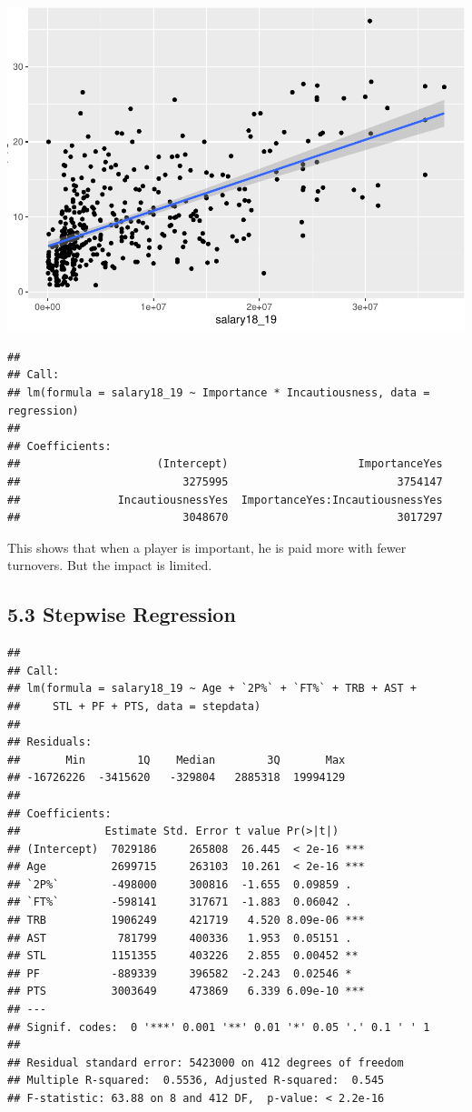 \documentclass[]{article}
\begin{document}
\includegraphics{Final_Report_files/figure-latex/unnamed-chunk-16-1.pdf}

\begin{verbatim}
## 
## Call:
## lm(formula = salary18_19 ~ Importance * Incautiousness, data = regression)
## 
## Coefficients:
##                     (Intercept)                    ImportanceYes  
##                         3275995                          3754147  
##               IncautiousnessYes  ImportanceYes:IncautiousnessYes  
##                         3048670                          3017297
\end{verbatim}

This shows that when a player is important, he is paid more with fewer
turnovers. But the impact is limited.

\subsection{5.3 Stepwise Regression}\label{stepwise-regression}

\begin{verbatim}
## 
## Call:
## lm(formula = salary18_19 ~ Age + `2P%` + `FT%` + TRB + AST + 
##     STL + PF + PTS, data = stepdata)
## 
## Residuals:
##       Min        1Q    Median        3Q       Max 
## -16726226  -3415620   -329804   2885318  19994129 
## 
## Coefficients:
##             Estimate Std. Error t value Pr(>|t|)    
## (Intercept)  7029186     265808  26.445  < 2e-16 ***
## Age          2699715     263103  10.261  < 2e-16 ***
## `2P%`        -498000     300816  -1.655  0.09859 .  
## `FT%`        -598141     317671  -1.883  0.06042 .  
## TRB          1906249     421719   4.520 8.09e-06 ***
## AST           781799     400336   1.953  0.05151 .  
## STL          1151355     403226   2.855  0.00452 ** 
## PF           -889339     396582  -2.243  0.02546 *  
## PTS          3003649     473869   6.339 6.09e-10 ***
## ---
## Signif. codes:  0 '***' 0.001 '**' 0.01 '*' 0.05 '.' 0.1 ' ' 1
## 
## Residual standard error: 5423000 on 412 degrees of freedom
## Multiple R-squared:  0.5536, Adjusted R-squared:  0.545 
## F-statistic: 63.88 on 8 and 412 DF,  p-value: < 2.2e-16
\end{verbatim}
\end{document}
